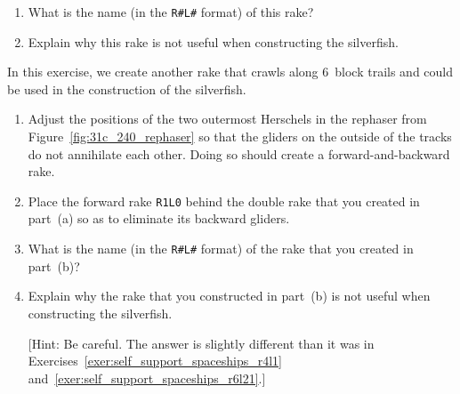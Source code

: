 \begin{multicols}{2}
\begin{problem}
	\begin{enumerate}[label=\bf\color{ocre}(\alph*)]
		\item What is the name (in the \texttt{R\#L\#} format) of this rake?
		
		\item Explain why this rake is not useful when constructing the silverfish.
	\end{enumerate}
\end{problem}


\mfilbreak


\begin{problem}\label{exer:self_support_spaceships_r2l16}
	In this exercise, we create another rake that crawls along $6$~block trails and could be used in the construction of the silverfish.
	
	\begin{enumerate}[label=\bf\color{ocre}(\alph*)]
		\item Adjust the positions of the two outermost Herschels in the rephaser from Figure~\ref{fig:31c_240_rephaser} so that the gliders on the outside of the tracks do not annihilate each other. Doing so should create a forward-and-backward rake.
		
		\item Place the forward rake \texttt{R1L0} behind the double rake that you created in part~(a) so as to eliminate its backward gliders.
		
		\item What is the name (in the \texttt{R\#L\#} format) of the rake that you created in part~(b)?
		
		\item Explain why the rake that you constructed in part~(b) is not useful when constructing the silverfish.
		
		[Hint: Be careful. The answer is slightly different than it was in Exercises~\ref{exer:self_support_spaceships_r4l1} and~\ref{exer:self_support_spaceships_r6l21}.]
	\end{enumerate}
\end{problem}


\end{multicols}
\normalsize\vspace*{0.01cm}
